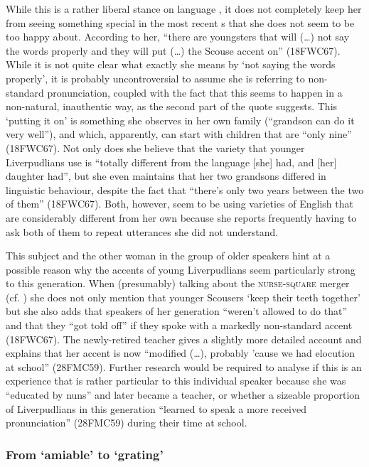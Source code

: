 While this is a rather liberal stance on language , it does not completely keep her from seeing something special in the most recent s that she does not seem to be too happy about.
According to her, ``there are youngsters that will (\ldots) not say the words properly and they will put (\ldots) the Scouse accent on'' (18FWC67).
While it is not quite clear what exactly she means by `not saying the words properly', it is probably uncontroversial to assume she is referring to non-standard pronunciation, coupled with the fact that this seems to happen in a non-natural, inauthentic way, as the second part of the quote suggests. This `putting it on' is something she observes in her own family (``grandson can do it very well''), and which, apparently, can start with children that are ``only nine'' (18FWC67).
Not only does she believe that the variety that younger Liverpudlians use is ``totally different from the language [she] had, and [her] daughter had'', but she even maintains that her two grandsons differed in linguistic behaviour, despite the fact that ``there's only two years between the two of them'' (18FWC67).
Both, however, seem to be using varieties of English that are considerably different from her own because she reports frequently having to ask both of them to repeat utterances she did not understand.

This subject and the other woman in the group of older speakers hint at a possible reason why the accents of young Liverpudlians seem particularly strong to this generation.
When (presumably) talking about the \textsc{nurse}-\textsc{square} merger (cf. ) she does not only mention that younger Scousers `keep their teeth together' but she also adds that speakers of her generation ``weren't allowed to do that'' and that they ``got told off'' if they spoke with a markedly non-standard accent (18FWC67).
The newly-retired teacher gives a slightly more detailed account and explains that her accent is now ``modified (\ldots), probably 'cause we had elocution at school'' (28FMC59).
Further research would be required to analyse if this is an experience that is rather particular to this individual speaker because she was ``educated by nuns'' and later became a teacher, or whether a sizeable proportion of Liverpudlians in this generation ``learned to speak a more received pronunciation'' (28FMC59) during their time at school.

\subsubsection{From `amiable' to `grating'}
\label{aware_res.eval.old.like}


